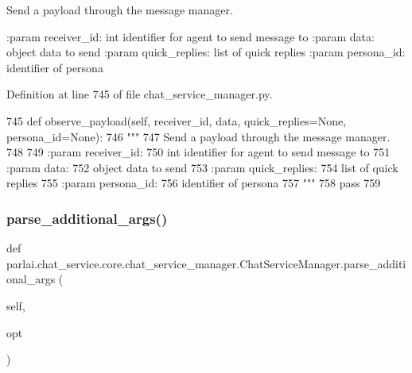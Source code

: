 \begin{DoxyVerb}Send a payload through the message manager.

:param receiver_id:
    int identifier for agent to send message to
:param data:
    object data to send
:param quick_replies:
    list of quick replies
:param persona_id:
    identifier of persona
\end{DoxyVerb}
 

Definition at line 745 of file chat\+\_\+service\+\_\+manager.\+py.


\begin{DoxyCode}
745     \textcolor{keyword}{def }observe\_payload(self, receiver\_id, data, quick\_replies=None, persona\_id=None):
746         \textcolor{stringliteral}{"""}
747 \textcolor{stringliteral}{        Send a payload through the message manager.}
748 \textcolor{stringliteral}{}
749 \textcolor{stringliteral}{        :param receiver\_id:}
750 \textcolor{stringliteral}{            int identifier for agent to send message to}
751 \textcolor{stringliteral}{        :param data:}
752 \textcolor{stringliteral}{            object data to send}
753 \textcolor{stringliteral}{        :param quick\_replies:}
754 \textcolor{stringliteral}{            list of quick replies}
755 \textcolor{stringliteral}{        :param persona\_id:}
756 \textcolor{stringliteral}{            identifier of persona}
757 \textcolor{stringliteral}{        """}
758         \textcolor{keywordflow}{pass}
759 
\end{DoxyCode}
\mbox{\label{classparlai_1_1chat__service_1_1core_1_1chat__service__manager_1_1ChatServiceManager_acf204463db3ea8e4a3929d5191890cbc}} 
\subsubsection{\texorpdfstring{parse\+\_\+additional\+\_\+args()}{parse\_additional\_args()}}
{\footnotesize\ttfamily def parlai.\+chat\+\_\+service.\+core.\+chat\+\_\+service\+\_\+manager.\+Chat\+Service\+Manager.\+parse\+\_\+additional\+\_\+args (\begin{DoxyParamCaption}\item[{}]{self,  }\item[{}]{opt }\end{DoxyParamCaption})}


